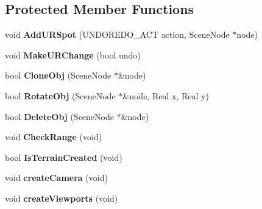 \subsection*{Protected Member Functions}
\begin{DoxyCompactItemize}
\item 
\hypertarget{class_p_f_b_application_ae96b68778bd0c4cf7b7fa9ad46fff71b}{
void {\bfseries AddURSpot} (UNDOREDO\_\-ACT action, SceneNode $\ast$node)}
\label{class_p_f_b_application_ae96b68778bd0c4cf7b7fa9ad46fff71b}

\item 
\hypertarget{class_p_f_b_application_a892628495d6e2946560578312396644a}{
void {\bfseries MakeURChange} (bool undo)}
\label{class_p_f_b_application_a892628495d6e2946560578312396644a}

\item 
\hypertarget{class_p_f_b_application_a1c48eaacc89f5dd3005f5b256915efb9}{
bool {\bfseries CloneObj} (SceneNode $\ast$\&node)}
\label{class_p_f_b_application_a1c48eaacc89f5dd3005f5b256915efb9}

\item 
\hypertarget{class_p_f_b_application_a1d0289047b45a65b32e04a35179ef562}{
bool {\bfseries RotateObj} (SceneNode $\ast$\&node, Real x, Real y)}
\label{class_p_f_b_application_a1d0289047b45a65b32e04a35179ef562}

\item 
\hypertarget{class_p_f_b_application_afbb7c0aa1773b547eaeb887c6b8b60d7}{
bool {\bfseries DeleteObj} (SceneNode $\ast$\&node)}
\label{class_p_f_b_application_afbb7c0aa1773b547eaeb887c6b8b60d7}

\item 
\hypertarget{class_p_f_b_application_a453bc3581523ec217e15194a6b358115}{
void {\bfseries CheckRange} (void)}
\label{class_p_f_b_application_a453bc3581523ec217e15194a6b358115}

\item 
\hypertarget{class_p_f_b_application_ace744423ee424df04c5ce152b34ff66b}{
bool {\bfseries IsTerrainCreated} (void)}
\label{class_p_f_b_application_ace744423ee424df04c5ce152b34ff66b}

\item 
\hypertarget{class_p_f_b_application_a61fd5186d5b255afe8110d10d7b2009b}{
void {\bfseries createCamera} (void)}
\label{class_p_f_b_application_a61fd5186d5b255afe8110d10d7b2009b}

\item 
\hypertarget{class_p_f_b_application_af24f0f1564aaa8dc1546d38f082aa18c}{
void {\bfseries createViewports} (void)}
\label{class_p_f_b_application_af24f0f1564aaa8dc1546d38f082aa18c}


\end{DoxyCompactItemize}
